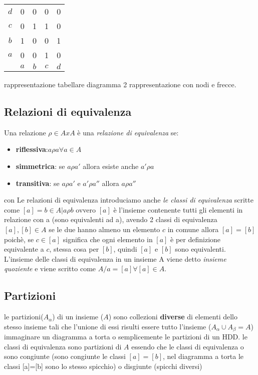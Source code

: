 \documentclass{article}
\begin{document}
    \begin{tabular}{ c c c c c }
        \(d\) & 0 & 0 & 0 & 0  \\ 
        \(c\) & 0 & 1 & 1 & 0  \\ 
        \(b\) & 1 & 0 & 0 & 1  \\ 
        \(a\) & 0 & 0 & 1 & 0  \\ 
        &\(a\) & \(b\) & \(c\) & \(d\) 
    \end{tabular}

    rappresentazione tabellare
    diagramma 2%
    rappresentazione con nodi e frecce.

    \subsection{Relazioni di equivalenza}
        Una relazione $\rho \in AxA$ è una \textit{relazione di equivalenza} se:

        \begin{itemize}
            \item \textbf{riflessiva}:$a\rho a \forall a \in A$
            \item \textbf{simmetrica}: se $a\rho a'$ allora esiste anche $a' \rho a$
            \item \textbf{transitiva}: se $a \rho a'$ e $a' \rho a''$ allora $a\rho a''$
        \end{itemize}

        con Le relazioni di equivalenza introduciamo anche \textit{le classi di equivalenza} scritte come $[a]=b\in A | a\rho b$ ovvero $[a]$ è l'insieme contenente tutti gli elementi in relazione con a (sono equivalenti ad a), avendo 2 classi di equivalenza $[a],[b] \in A$ se le due hanno almeno un elemento $c$ in comune allora $[a]=[b]$ poichè, se $c \in [a]$ significa che ogni elemento in $[a]$ è per definizione equivalente a $c$, stessa cosa per $[b]$, quindi $[a]$ e $[b]$ sono equivalenti.\\
        L'insieme delle classi di equivalenza in un insieme A viene detto \textit{insieme quoziente} e viene scritto come $A/a =[a] \forall [a] \in A$.

    \subsection{Partizioni}
        le partizioni($A_{\alpha}$) di un insieme ($A$) sono collezioni \textbf{diverse} di elementi dello stesso insieme tali che l'unione di essi risulti essere tutto l'insieme ($A_{\alpha}\cup A_{\beta}=A$) immaginare un diagramma a torta o semplicemente le partizioni di un HDD.
        le classi di equivalenza sono partizioni di $A$ essendo che le classi di equivalenza o sono congiunte (sono congiunte le classi $[a]=[b]$, nel diagramma a torta le classi [a]=[b] sono lo stesso spicchio) o disgiunte (spicchi diversi)
\end{document}
